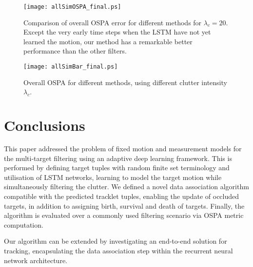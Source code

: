 \documentclass[runningheads]{llncs}
\begin{document}
\begin{figure}[!t]
\centering
\texttt{[image: allSimOSPA\_final.ps]}
\caption{Comparison of overall OSPA error for different methods for $\lambda_c=20$. Except the very early time steps when the LSTM have not yet learned the motion, our method has a remarkable better performance than the other filters.}
\label{fig:OSPA_time}
\end{figure}

\begin{figure}[!t]
\centering
\texttt{[image: allSimBar\_final.ps]}
\caption{Overall OSPA for different methods, using different clutter intensity $\lambda_c$.}
\label{fig:OSPAClutter}
\end{figure}

\section{Conclusions}\label{sec:conc}
This paper addressed the problem of fixed motion and measurement models for the multi-target filtering using an adaptive deep learning framework. This is performed by defining target tuples with random finite set terminology and utilisation of LSTM networks, learning to model the target motion while simultaneously filtering the clutter. We defined a novel data association algorithm compatible with the predicted tracklet tuples, enabling the update of occluded targets, in addition to assigning birth, survival and death of targets. Finally, the algorithm is evaluated over a commonly used filtering scenario via OSPA metric computation.

Our algorithm can be extended by investigating an end-to-end solution for tracking, encapsulating the data association step within the recurrent neural network architecture.




\end{document}
